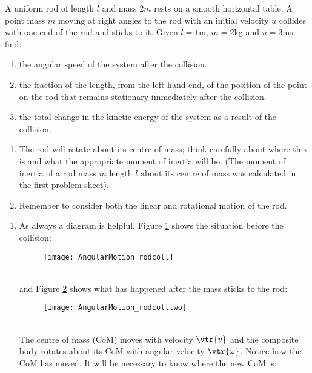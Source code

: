 \begin{hint}
{
A uniform rod of length $l$ and mass $2m$ rests on a smooth horizontal table. A point mass $m$ moving at right angles to the rod with an initial velocity $u$ collides with one end of the rod and sticks to it. Given $l=1$m, $m=2$kg and $u=3$ms, find:
\begin{enumerate}
\item the angular speed of the system after the collision.
\item the fraction of the length, from the left hand end, of the position of the point on the rod that remains stationary immediately after the collision.
\item the total change in the kinetic energy of the system as a result of the collision. 
\end{enumerate}
}
{
\begin{enumerate}
\item The rod will rotate about its centre of mass; think carefully about where this is and what the appropriate moment of inertia will be. (The moment of inertia of a rod mass $m$ length $l$ about its centre of mass was calculated in the first problem sheet).  
\item Remember to consider both the linear and rotational motion of the rod.  
\end{enumerate}
}
{%
}
{
\begin{enumerate}
\item As always a diagram is helpful. Figure \ref{fig:AngularMotion_rodcoll} shows the situation before the collision:
\begin{figure}[h] 
\centering
\texttt{[image: AngularMotion\_rodcoll]}
\caption{}
\label{fig:AngularMotion_rodcoll}
\end{figure}
\\
and Figure \ref{fig:AngularMotion_rodcolltwo} shows what has happened after the mass sticks to the rod:
\begin{figure}[h] 
\centering
\texttt{[image: AngularMotion\_rodcolltwo]}
\caption{}
\label{fig:AngularMotion_rodcolltwo}
\end{figure}
\\
The centre of mass (CoM) moves with velocity $\vtr{v}$ and the composite body rotates about its CoM with angular velocity $\vtr{\omega}$. Notice how the CoM has moved. It will be necessary to know where the new CoM is:

\end{enumerate}}
\end{hint}
